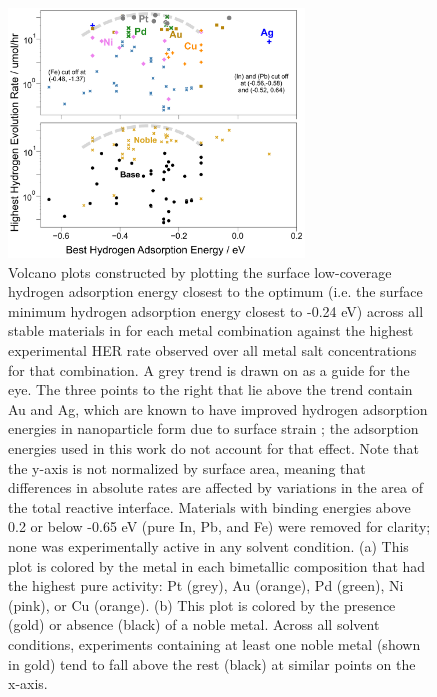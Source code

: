 \documentclass[preprint,12pt]{elsarticle}
\begin{document}
\begin{figure}[h]
\centering
    \includegraphics[width=0.7\textwidth]{figures/fig_4.pdf}
\caption{Volcano plots constructed by plotting the surface low-coverage hydrogen adsorption energy closest to the optimum (i.e. the surface minimum hydrogen adsorption energy closest to -0.24 eV) across all stable materials in for each metal combination against the highest experimental HER rate observed over all metal salt concentrations for that combination. A grey trend is drawn on as a guide for the eye. The three points to the right that lie above the trend contain Au and Ag, which are known to have improved hydrogen adsorption energies in nanoparticle form due to surface strain \cite{tran2018gold,campbell2009hydrogen}; the adsorption energies used in this work do not account for that effect. Note that the y-axis is not normalized by surface area, meaning that differences in absolute rates are affected by variations in the area of the total reactive interface. Materials with binding energies above 0.2 or below -0.65 eV (pure In, Pb, and Fe) were removed for clarity; none was experimentally active in any solvent condition. (a) This plot is colored by the metal in each bimetallic composition that had the highest pure activity: Pt (grey), Au (orange), Pd (green), Ni (pink), or Cu (orange). (b) This plot is colored by the presence (gold) or absence (black) of a noble metal. Across all solvent conditions, experiments containing at least one noble metal (shown in gold) tend to fall above the rest (black) at similar points on the x-axis.
}
\end{figure}
\end{document}
